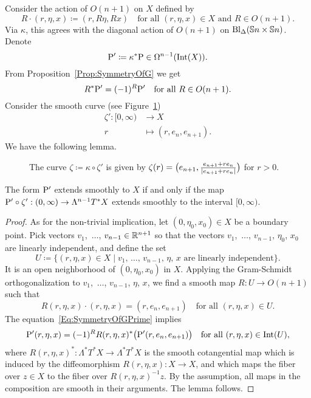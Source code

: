 \documentclass[\MainFolder/Text.tex]{subfiles}
\begin{document}
%
Consider the action of $O(n+1)$ on $X$ defined by
$$ R\cdot(r,\eta,x) \coloneqq (r,R\eta,Rx)\quad\text{for all }(r,\eta,x)\in X\text{ and }R\in O(n+1). $$
Via $\kappa$, this agrees with the diagonal action of $O(n+1)$ on $\mathrm{Bl}_\Delta(\mathbb{S}{n}\times\mathbb{S}{n})$. Denote
$$ \mathrm{P}'\coloneqq \kappa^* \mathrm{P} \in \Omega^{n-1}(\mathrm{Int}(X)). $$
From Proposition~\ref{Prop:SymmetryOfG} we get
\begin{equation} \label{Eq:SymmetryOfGPrime}
R^* \mathrm{P}' = (-1)^R \mathrm{P}'\quad \text{for all }R\in O(n+1).
\end{equation}
%
Consider the smooth curve (see Figure~\ref{Fig:CurveOnSphere})
\begin{equation*}\label{Eq:CurveZetaDef}
 \begin{aligned} \zeta': [0,\infty) &\longrightarrow  X \\
                    r &\longmapsto (r,e_n,e_{n+1}). \end{aligned}
\end{equation*}
We have the following lemma.
%
\begin{figure}[t]\centering

\caption[A curve approaching the diagonal in the configuration space $C_2(\Sph{n})$.]{The curve $\zeta\coloneqq \kappa \circ \zeta'$ is given by $\zeta(r)=\bigl(e_{n+1},\frac{e_{n+1}+r e_n}{|e_{n+1}+r e_n|}\bigr)$ for $r>0$.}\label{Fig:CurveOnSphere}
\end{figure}
%
\begin{Lem} \label{Lem:ExtAlongCurve}
The form $\mathrm{P}'$ extends smoothly to $X$ if and only if the map $\mathrm{P}'\circ \zeta' : (0,\infty)\rightarrow \Lambda^{n-1}T^* X$ extends smoothly to the interval $[0,\infty)$. 
\end{Lem}
%
\begin{proof}
As for the non-trivial implication, let $(0,\eta_0,x_0) \in X$ be a boundary point. Pick vectors $v_1$,~$\dotsc$, $v_{n-1}\in \mathbb{R}^{n+1}$ so that the vectors $v_1$,~$\dotsc$, $v_{n-1}$, $\eta_0$, $x_0$ are linearly independent, and define the set 
$$ U\coloneqq\{(r,\eta,x)\in X \mid v_1,\,\dotsc,\,v_{n-1},\,\eta,\,x \text{ are linearly independent}\}. $$
It is an open neighborhood of $(0,\eta_0,x_0)$ in $X$. Applying the Gram-Schmidt orthogonalization to $v_1$,~$\dotsc$, $v_{n-1}$, $\eta$, $x$, we find a smooth map $R: U \rightarrow O(n+1)$ such that 
$$ R(r,\eta,x)\cdot (r,\eta,x) = (r,e_n,e_{n+1}) \quad \text{for all }(r,\eta,x)\in U. $$
The equation~\eqref{Eq:SymmetryOfGPrime} implies
$$ \mathrm{P}'(r,\eta,x) =(-1)^R R(r,\eta,x)^*\bigl(\mathrm{P}'(r,e_n,e_{n+1})\bigr)\quad\text{for all }(r,\eta,x)\in \mathrm{Int}(U), $$
where $R(r,\eta,x)^*: \Lambda^* T^* X \rightarrow \Lambda^* T^* X$ is the smooth cotangential map which is induced by the diffeomorphism $R(r,\eta,x): X\rightarrow X$, and which maps the fiber over $z\in X$ to the fiber over $R(r,\eta,x)^{-1} z$. By the assumption, all maps in the composition are smooth in their arguments. The lemma follows.
\end{proof}
\end{document}
